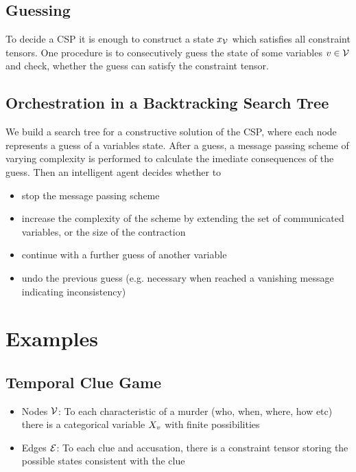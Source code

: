 \documentclass[aps,onecolumn,nofootinbib,pra]{article}
\begin{document}
\subsection{Guessing}

To decide a CSP it is enough to construct a state $x_{\mathcal{V}}$ which satisfies all constraint tensors.
One procedure is to consecutively guess the state of some variables $v\in\mathcal{V}$ and check, whether the guess can satisfy the constraint tensor.

\subsection{Orchestration in a Backtracking Search Tree}

We build a search tree for a constructive solution of the CSP, where each node represents a guess of a variables state.
After a guess, a message passing scheme of varying complexity  is performed to calculate the imediate consequences of the guess.
Then an intelligent agent decides whether to
\begin{itemize}
	\item stop the message passing scheme
	\item increase the complexity of the scheme by extending the set of communicated variables, or the size of the contraction
	\item continue with a further guess of another variable
	\item undo the previous guess (e.g. necessary when reached a vanishing message indicating inconsistency)
\end{itemize}


\section{Examples}

\subsection{Temporal Clue Game}

\begin{itemize}
	\item Nodes $\mathcal{V}$: To each characteristic of a murder (who, when, where, how etc) there is a categorical variable $X_{v}$ with finite possibilities
	\item Edges $\mathcal{E}$: To each clue and accusation, there is a constraint tensor storing the possible states consistent with the clue
\end{itemize}
\end{document}
